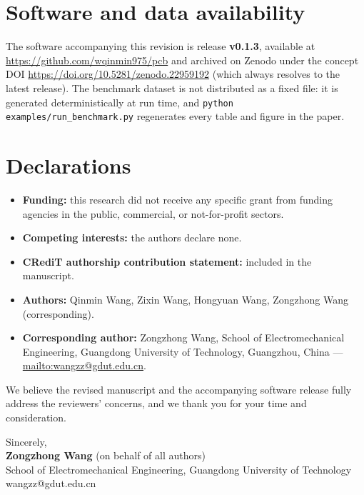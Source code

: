 \documentclass[11pt]{article}
\begin{document}
\section*{Software and data availability}

The software accompanying this revision is release \textbf{v0.1.3}, available at
\url{https://github.com/wqinmin975/pcb} and archived on Zenodo under the concept DOI
\url{https://doi.org/10.5281/zenodo.22959192} (which always resolves to the latest
release). The benchmark dataset is not distributed as a fixed file: it is generated
deterministically at run time, and \texttt{python examples/run\_benchmark.py} regenerates
every table and figure in the paper.

\section*{Declarations}

\begin{itemize}[leftmargin=*,itemsep=2pt]
\item \textbf{Funding:} this research did not receive any specific grant from funding
agencies in the public, commercial, or not-for-profit sectors.
\item \textbf{Competing interests:} the authors declare none.
\item \textbf{CRediT authorship contribution statement:} included in the manuscript.
\item \textbf{Authors:} Qinmin Wang, Zixin Wang, Hongyuan Wang, Zongzhong Wang
(corresponding).
\item \textbf{Corresponding author:} Zongzhong Wang, School of Electromechanical
Engineering, Guangdong University of Technology, Guangzhou, China ---
\url{mailto:wangzz@gdut.edu.cn}.
\end{itemize}

We believe the revised manuscript and the accompanying software release fully address the
reviewers' concerns, and we thank you for your time and consideration.

\vspace{12pt}
\noindent Sincerely,\\[14pt]
\noindent \textbf{Zongzhong Wang} (on behalf of all authors)\\
School of Electromechanical Engineering, Guangdong University of Technology\\
wangzz@gdut.edu.cn
\end{document}
